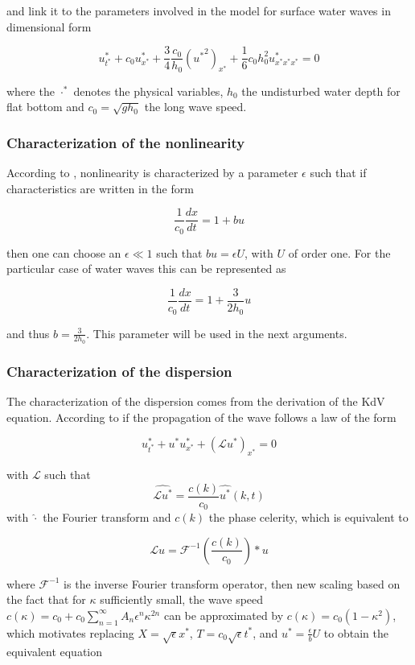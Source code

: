 \noindent and link it to the parameters involved in the model for surface water waves  in dimensional form \cite{Khorsand2014}

\begin{equation}
    u^*_{t^*} + c_0u^*_{x^*} + \frac{3}{4}\frac{c_0}{h_0}({u^*}^2)_{x^*} + \frac{1}{6}c_0h_0^2u^*_{x^*x^*x^*} = 0 
\end{equation}

\noindent where the $\cdot^*$ denotes the physical variables, $h_0$ the undisturbed water depth for flat bottom and $c_0 = \sqrt{gh_0}$  the long wave speed.

\subsubsection{Characterization of the nonlinearity}

\indent According to \cite{BBM1971}, nonlinearity is characterized by a parameter $\epsilon$ such that if characteristics are written in the form

$$ \frac{1}{c_0} \frac{dx}{dt} = 1+ bu$$

\noindent then one can choose an $\epsilon \ll 1$ such that $bu=\epsilon U$, with $U$ of order one. For the particular case of water waves this can be represented as

$$ \frac{1}{c_0} \frac{dx}{dt} = 1 + \frac{3}{2h_0}u$$

\noindent and thus $b = \frac{3}{2h_0}$. This parameter will be used in the next arguments.

\subsubsection{Characterization of the dispersion}

\noindent The characterization of the dispersion comes from the derivation of the KdV equation. According to \cite{BBM1971} if the propagation of the wave follows a law of the form

$$ u^*_{t^*} + u^*u^*_{x^*}+(\mathcal{L} u^*)_{x^*} = 0$$

\noindent with $\mathcal{L}$ such that $$ \widehat{\mathcal{L}u^*} = \frac{c(k)}{c_0} \widehat{u^*}(k,t)$$ with $\hat \cdot$ the Fourier transform and $c(k)$ the phase celerity, which is equivalent to 

$$ \mathcal{L} u = \mathcal{F}^{-1}\left(\frac{c(k)}{c_0}\right) * u$$ 

\noindent where $\mathcal{F}^{-1}$ is the inverse Fourier transform operator, then new scaling based on the fact that for $\kappa$ sufficiently small, the wave speed $c(\kappa) = c_0 + c_0 \sum_{n=1}^{\infty}A_n\epsilon^n\kappa^{2n}$ can be approximated by $c(\kappa) = c_0(1-\kappa^2)$, which motivates replacing $ X=\sqrt{\epsilon}x^*$, $T =c_0 \sqrt{\epsilon} t^*$, and $u^* = \frac{\epsilon}{ b} U$ to obtain the equivalent equation 

